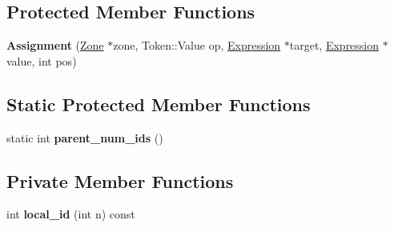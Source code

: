 \subsection*{Protected Member Functions}
\begin{DoxyCompactItemize}
\item 
{\bfseries Assignment} (\hyperlink{classv8_1_1internal_1_1_zone}{Zone} $\ast$zone, Token\+::\+Value op, \hyperlink{classv8_1_1internal_1_1_expression}{Expression} $\ast$target, \hyperlink{classv8_1_1internal_1_1_expression}{Expression} $\ast$value, int pos)\hypertarget{classv8_1_1internal_1_1_assignment_af123cd35f02f7c458d84c815abbd48c0}{}\label{classv8_1_1internal_1_1_assignment_af123cd35f02f7c458d84c815abbd48c0}

\end{DoxyCompactItemize}
\subsection*{Static Protected Member Functions}
\begin{DoxyCompactItemize}
\item 
static int {\bfseries parent\+\_\+num\+\_\+ids} ()\hypertarget{classv8_1_1internal_1_1_assignment_a57f3860e136326ae7abcf6c149de604d}{}\label{classv8_1_1internal_1_1_assignment_a57f3860e136326ae7abcf6c149de604d}

\end{DoxyCompactItemize}
\subsection*{Private Member Functions}
\begin{DoxyCompactItemize}
\item 
int {\bfseries local\+\_\+id} (int n) const \hypertarget{classv8_1_1internal_1_1_assignment_aa9fc10a2ac29b75507a3329628882af6}{}\label{classv8_1_1internal_1_1_assignment_aa9fc10a2ac29b75507a3329628882af6}

\end{DoxyCompactItemize}
